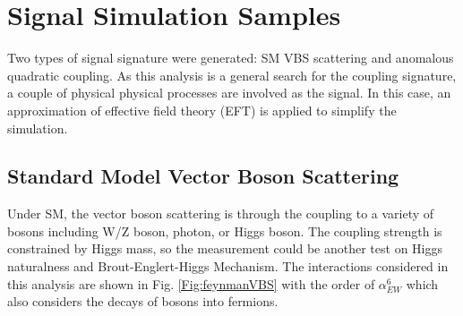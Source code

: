 \section{Signal Simulation Samples}
Two types of signal signature were generated: SM VBS scattering and anomalous quadratic coupling. As this analysis is a general search for the coupling signature, a couple of physical physical processes are involved as the signal. In this case, an approximation of effective field theory (EFT) is applied to simplify the simulation. 

\subsection{Standard Model Vector Boson Scattering}
Under SM, the vector boson scattering is through the coupling to a variety of bosons including W/Z boson, photon, or Higgs boson. The coupling strength is constrained by Higgs mass, so the measurement could be another test on Higgs naturalness and  Brout-Englert-Higgs Mechanism. The interactions considered in this analysis are shown in Fig. \ref{Fig:feynmanVBS}  with the order of $\alpha_{EW}^6$ which also considers the decays of bosons into fermions. 

